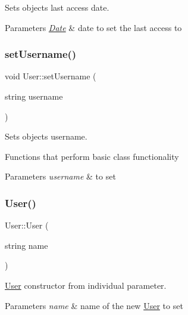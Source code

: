 Sets object\textquotesingle{}s last access date. 


\begin{DoxyParams}{Parameters}
{\em \hyperlink{class_date}{Date}} & date to set the last access to \\
\hline
\end{DoxyParams}
\mbox{\label{group___user_ga0fed77d10cd142ee4112d650ec564e6b}} 
\subsubsection{\texorpdfstring{set\+Username()}{setUsername()}}
{\footnotesize\ttfamily void User\+::set\+Username (\begin{DoxyParamCaption}\item[{string}]{username }\end{DoxyParamCaption})}



Sets object\textquotesingle{}s username. 

Functions that perform basic class functionality 
\begin{DoxyParams}{Parameters}
{\em username} & to set \\
\hline
\end{DoxyParams}
\mbox{\label{group___user_gab4d18a829f31eae091669ac36782a396}} 
\subsubsection{\texorpdfstring{User()}{User()}\hspace{0.1cm}{\footnotesize\ttfamily [1/2]}}
{\footnotesize\ttfamily User\+::\+User (\begin{DoxyParamCaption}\item[{string}]{name }\end{DoxyParamCaption})}



\hyperlink{class_user}{User} constructor from individual parameter. 


\begin{DoxyParams}{Parameters}
{\em name} & name of the new \hyperlink{class_user}{User} to set \\
\hline
\end{DoxyParams}
\mbox{\label{group___user_ga4cad036bd4872821fa6c2585c8778461}} 
